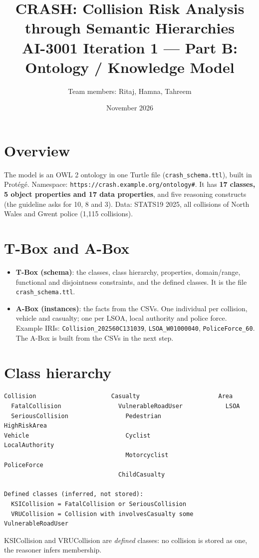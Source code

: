 \documentclass[10.5pt,a4paper]{article}
\title{CRASH: Collision Risk Analysis through Semantic Hierarchies\\[4pt]\large AI-3001 Iteration 1 --- Part B: Ontology / Knowledge Model}
\author{Team members: Ritaj, Hamna, Tahreem}\date{November 2026}
\begin{document}
\maketitle

\section{Overview}
The model is an OWL 2 ontology in one Turtle file (\texttt{crash\_schema.ttl}), built in Protégé. Namespace: \texttt{https://crash.example.org/ontology\#}. It has \textbf{17 classes, 5 object properties and 17 data properties}, and five reasoning constructs (the guideline asks for 10, 8 and 3). Data: STATS19 2025, all collisions of North Wales and Gwent police (1,115 collisions).

\section{T-Box and A-Box}
\begin{itemize}[nosep]
\item \textbf{T-Box (schema)}: the classes, class hierarchy, properties, domain/range, functional and disjointness constraints, and the defined classes. It is the file \texttt{crash\_schema.ttl}.
\item \textbf{A-Box (instances)}: the facts from the CSVs. One individual per collision, vehicle and casualty; one per LSOA, local authority and police force. Example IRIs: \texttt{Collision\_202560C131039}, \texttt{LSOA\_W01000040}, \texttt{PoliceForce\_60}. The A-Box is built from the CSVs in the next step.
\end{itemize}

\section{Class hierarchy}
\begin{verbatim}
Collision                     Casualty                      Area
  FatalCollision                VulnerableRoadUser            LSOA
  SeriousCollision                Pedestrian                    HighRiskArea
Vehicle                           Cyclist                     LocalAuthority
                                  Motorcyclist                PoliceForce
                                ChildCasualty

Defined classes (inferred, not stored):
  KSICollision = FatalCollision or SeriousCollision
  VRUCollision = Collision with involvesCasualty some VulnerableRoadUser
\end{verbatim}
KSICollision and VRUCollision are \emph{defined} classes: no collision is stored as one, the reasoner infers membership.
\end{document}
